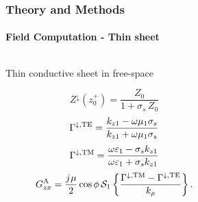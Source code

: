 \documentclass[mathserif,16pt,xcolor=table]{beamer}
\begin{document}
\begin{frame}
  \frametitle{Theory and Methods}
  \framesubtitle{Field Computation - Thin sheet}
  \begin{columns}[T] %
    \begin{column}{.65\textwidth}
      \begin{outline}[itemize]
        \1 Thin conductive sheet in free-space
      \end{outline}
      \begin{equation} \nonumber
        Z^{\downarrow}(z_0^+) = \frac{Z_0}{ 1 + \sigma_s \, Z_0}
      \end{equation}
      \begin{equation} \nonumber
        \Gamma^{\downarrow, \mathrm{TE}} = \frac{k_{z1} - \omega \mu_1 \sigma_s }{k_{z1} + \omega \mu_1 \sigma_s}
      \end{equation}
      \begin{equation} \nonumber
        \Gamma^{\downarrow, \mathrm{TM}} = \frac{ \omega \varepsilon_1 -\sigma_s k_{z1} }{\omega \varepsilon_1 + \sigma_s k_{z1}}
      \end{equation}
      \begin{equation} \nonumber
        G_{zx}^\mathrm{A} = \frac{{j}\mkern1mu \mu}{2} \cos \phi \, \mathcal{S}_1 \left \{ \frac{\Gamma^{\downarrow, \mathrm{TM}} - \Gamma^{\downarrow, \mathrm{TE}}}{ k_{\rho}} \right \}.
        \label{eq:somm_Gzx}
      \end{equation}
    \end{column}
    \begin{column}[T]{.5\textwidth}
      \begin{figure}
        \centering \vspace*{-1.5cm} \hspace*{-1cm}
        \fontsize{6}{7}\selectfont
        \def\svgwidth{.5\linewidth}
        
      \end{figure}
    \end{column}
  \end{columns}
\end{frame}
\end{document}
